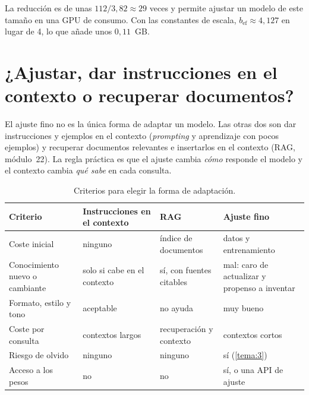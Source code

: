 La reducción es de unas $112/3{,}82\approx 29$ veces y permite ajustar un modelo de este tamaño en una GPU de consumo. Con las constantes de escala, $b_{\mathrm{ef}}\approx 4{,}127$ en lugar de 4, lo que añade unos $0{,}11$~GB.

\section{¿Ajustar, dar instrucciones en el contexto o recuperar documentos?}

El ajuste fino no es la única forma de adaptar un modelo. Las otras dos son dar instrucciones y ejemplos en el contexto (\emph{prompting} y aprendizaje con pocos ejemplos) y recuperar documentos relevantes e insertarlos en el contexto (RAG, módulo~22). La regla práctica es que el ajuste cambia \emph{cómo} responde el modelo y el contexto cambia \emph{qué sabe} en cada consulta.

\begin{table}[h]
\centering\small
\caption{Criterios para elegir la forma de adaptación.}\label{tab:eleccion}
\begin{tabularx}{\textwidth}{@{}>{\raggedright\arraybackslash}p{3.3cm}>{\raggedright\arraybackslash}X>{\raggedright\arraybackslash}X>{\raggedright\arraybackslash}X@{}}
\toprule
Criterio & Instrucciones en el contexto & RAG & Ajuste fino \\
\midrule
Coste inicial & ninguno & índice de documentos & datos y entrenamiento \\
Conocimiento nuevo o cambiante & solo si cabe en el contexto & sí, con fuentes citables & mal: caro de actualizar y propenso a inventar \\
Formato, estilo y tono & aceptable & no ayuda & muy bueno \\
Coste por consulta & contextos largos & recuperación y contexto & contextos cortos \\
Riesgo de olvido & ninguno & ninguno & sí (\cref{tema:3}) \\
Acceso a los pesos & no & no & sí, o una API de ajuste \\
\bottomrule
\end{tabularx}
\end{table}

